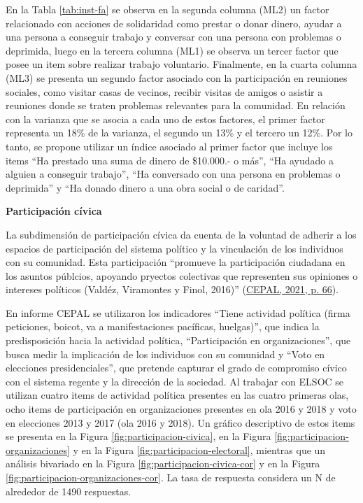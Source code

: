 \documentclass[
  12pt,
]{book}
\begin{document}
En la Tabla \ref{tab:inst-fa} se observa en la segunda columna (ML2) un factor relacionado con acciones de solidaridad como prestar o donar dinero, ayudar a una persona a conseguir trabajo y conversar con una persona con problemas o deprimida, luego en la tercera columna (ML1) se observa un tercer factor que posee un item sobre realizar trabajo voluntario. Finalmente, en la cuarta columna (ML3) se presenta un segundo factor asociado con la participación en reuniones sociales, como visitar casas de vecinos, recibir visitas de amigos o asistir a reuniones donde se traten problemas relevantes para la comunidad. En relación con la varianza que se asocia a cada uno de estos factores, el primer factor representa un 18\% de la varianza, el segundo un 13\% y el tercero un 12\%. Por lo tanto, se propone utilizar un índice asociado al primer factor que incluye los items ``Ha prestado una suma de dinero de \$10.000.- o más'', ``Ha ayudado a alguien a conseguir trabajo'', ``Ha conversado con una persona en problemas o deprimida'' y ``Ha donado dinero a una obra social o de caridad''.

\textbf{Participación cívica}

La subdimensión de participación cívica da cuenta de la voluntad de adherir a los espacios de participación del sistema político y la vinculación de los individuos con su comunidad. Esta participación ``promueve la participación ciudadana en los asuntos públcios, apoyando pryectos colectivas que representen sus opiniones o intereses políticos (Valdéz, Viramontes y Finol, 2016)'' (\protect\hyperlink{ref-cepal_cohesion_2021}{CEPAL, 2021, p. 66}).

En informe CEPAL se utilizaron los indicadores ``Tiene actividad política (firma peticiones, boicot, va a manifestaciones pacíficas, huelgas)'', que indica la predisposición hacia la actividad política, ``Participación en organizaciones'', que busca medir la implicación de los individuos con su comunidad y ``Voto en elecciones presidenciales'', que pretende capturar el grado de compromiso cívico con el sistema regente y la dirección de la sociedad. Al trabajar con ELSOC se utilizan cuatro items de actividad política presentes en las cuatro primeras olas, ocho items de participación en organizaciones presentes en ola 2016 y 2018 y voto en elecciones 2013 y 2017 (ola 2016 y 2018). Un gráfico descriptivo de estos items se presenta en la Figura \ref{fig:participacion-civica}, en la Figura \ref{fig:participacion-organizaciones} y en la Figura \ref{fig:participacion-electoral}, mientras que un análisis bivariado en la Figura \ref{fig:participacion-civica-cor} y en la Figura \ref{fig:participacion-organizaciones-cor}. La tasa de respuesta considera un N de alrededor de 1490 respuestas.
\end{document}

